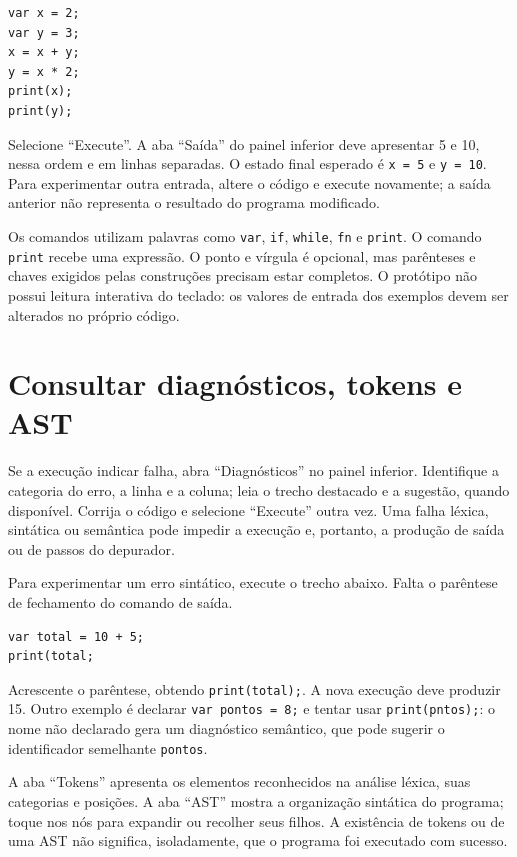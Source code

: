 \begin{lstlisting}[language={},numbers=none]
var x = 2;
var y = 3;
x = x + y;
y = x * 2;
print(x);
print(y);
\end{lstlisting}

Selecione ``Execute''. A aba ``Saída'' do painel inferior deve apresentar 5 e 10,
nessa ordem e em linhas separadas. O estado final esperado é \texttt{x = 5} e
\texttt{y = 10}. Para experimentar outra entrada, altere o código e execute
novamente; a saída anterior não representa o resultado do programa modificado.

Os comandos utilizam palavras como \texttt{var}, \texttt{if}, \texttt{while},
\texttt{fn} e \texttt{print}. O comando \texttt{print} recebe uma expressão.
O ponto e vírgula é opcional, mas parênteses e chaves exigidos pelas construções
precisam estar completos. O protótipo não possui leitura interativa do teclado:
os valores de entrada dos exemplos devem ser alterados no próprio código.

\section*{Consultar diagnósticos, tokens e AST}

Se a execução indicar falha, abra ``Diagnósticos'' no painel inferior. Identifique
a categoria do erro, a linha e a coluna; leia o trecho destacado e a sugestão,
quando disponível. Corrija o código e selecione ``Execute'' outra vez. Uma falha
léxica, sintática ou semântica pode impedir a execução e, portanto, a produção
de saída ou de passos do depurador.

Para experimentar um erro sintático, execute o trecho abaixo. Falta o parêntese
de fechamento do comando de saída.

\begin{lstlisting}[language={},numbers=none]
var total = 10 + 5;
print(total;
\end{lstlisting}

Acrescente o parêntese, obtendo \texttt{print(total);}. A nova execução deve
produzir 15. Outro exemplo é declarar \texttt{var pontos = 8;} e tentar usar
\texttt{print(pntos);}: o nome não declarado gera um diagnóstico semântico,
que pode sugerir o identificador semelhante \texttt{pontos}.

A aba ``Tokens'' apresenta os elementos reconhecidos na análise léxica, suas
categorias e posições. A aba ``AST'' mostra a organização sintática do programa;
toque nos nós para expandir ou recolher seus filhos. A existência de tokens ou
de uma AST não significa, isoladamente, que o programa foi executado com sucesso.

